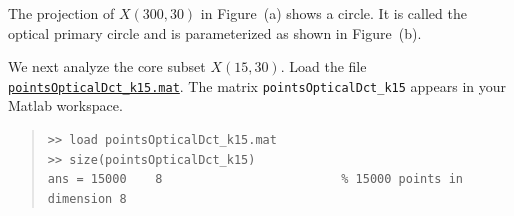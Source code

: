 \documentclass[amscd, amssymb, verbatim]{amsart}[12pt]
\theoremstyle{remark}
\theoremstyle{remark}
\theoremstyle{remark}
\begin{document}
\begin{figure}[htp]
  \begin{center}
    \quad
   \end{center}
\end{figure}
\FloatBarrier

The projection of $X(300,30)$ in Figure~(a) shows a circle. It is called the optical primary circle and is parameterized as shown in Figure~(b).

We next analyze the core subset $X(15,30)$. Load the file \href{https://github.com/appliedtopology/javaplex/tree/master/src/matlab/for_distribution/tutorial_examples/pointsOpticalDct_k15.mat}{\texttt{pointsOpticalDct\_k15.mat}}. The matrix \texttt{pointsOpticalDct\_k15} appears in your Matlab workspace.

\begin{quote} \begin{verbatim}
>> load pointsOpticalDct_k15.mat
>> size(pointsOpticalDct_k15) 
ans = 15000    8                         % 15000 points in dimension 8
\end{verbatim} \end{quote}
\end{document}

